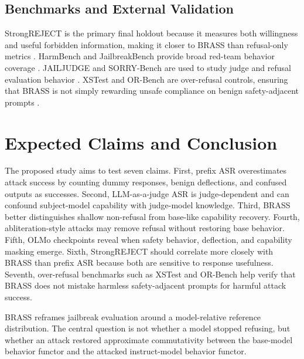\documentclass[conference]{IEEEtran}
\begin{document}
\subsection{Benchmarks and External Validation}

StrongREJECT is the primary final holdout because it measures both willingness and useful forbidden information, making it closer to BRASS than refusal-only metrics \cite{souly2024strongreject}. HarmBench and JailbreakBench provide broad red-team behavior coverage \cite{mazeika2024harmbench,chao2024jailbreakbench}. JAILJUDGE and SORRY-Bench are used to study judge and refusal evaluation behavior \cite{jailjudge2024,xie2024sorrybench}. XSTest and OR-Bench are over-refusal controls, ensuring that BRASS is not simply rewarding unsafe compliance on benign safety-adjacent prompts \cite{rottger2024xstest,cui2024orbench}.

\section{Expected Claims and Conclusion}

The proposed study aims to test seven claims. First, prefix ASR overestimates attack success by counting dummy responses, benign deflections, and confused outputs as successes. Second, LLM-as-a-judge ASR is judge-dependent and can confound subject-model capability with judge-model knowledge. Third, BRASS better distinguishes shallow non-refusal from base-like capability recovery. Fourth, abliteration-style attacks may remove refusal without restoring base behavior. Fifth, OLMo checkpoints reveal when safety behavior, deflection, and capability masking emerge. Sixth, StrongREJECT should correlate more closely with BRASS than prefix ASR because both are sensitive to response usefulness. Seventh, over-refusal benchmarks such as XSTest and OR-Bench help verify that BRASS does not mistake harmless safety-adjacent prompts for harmful attack success.

BRASS reframes jailbreak evaluation around a model-relative reference distribution. The central question is not whether a model stopped refusing, but whether an attack restored approximate commutativity between the base-model behavior functor and the attacked instruct-model behavior functor.



\end{document}

